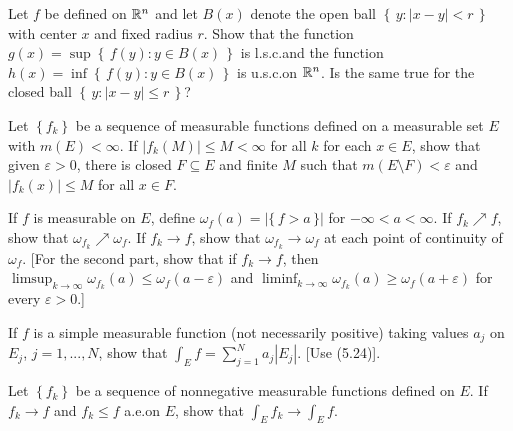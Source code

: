 \begin{problem}
  Let $f$ be defined on $\mathbb{R}^n$ and let $B(x)$ denote the open ball
  $\left\{\,y:|x-y|<r\,\right\}$ with center $x$ and fixed radius $r$. Show
  that the function $g(x)=\sup\left\{\,f(y):y\in B(x)\,\right\}$ is
  l.s.c.\@ and the function $h(x)=\inf\left\{\,f(y):y\in B(x)\,\right\}$ is
  u.s.c.\@ on $\mathbb{R}^n$. Is the same true for the closed ball
  $\left\{\,y:|x-y|\leq r\,\right\}$?
\end{problem}
\begin{solution}
\end{solution}

\begin{problem}
  Let $\left\{f_k\right\}$ be a sequence of measurable functions defined on
  a measurable set $E$ with $m(E)<\infty$. If $|f_k(M)|\leq M<\infty$ for
  all $k$ for each $x\in E$, show that given $\varepsilon>0$, there is
  closed $F\subseteq E$ and finite $M$ such that
  $m(E\setminus F)<\varepsilon$ and $|f_k(x)|\leq M$ for all $x\in F$.
\end{problem}
\begin{solution}
\end{solution}

\begin{problem}
  If $f$ is measurable on $E$, define $\omega_f(a)=|\{\,f>a\,\}|$ for
  $-\infty<a<\infty$. If $f_k\nearrow f$, show that
  $\omega_{f_k}\nearrow\omega_f$. If $f_k\to f$, show that
  $\omega_{f_k}\to\omega_f$ at each point of continuity of $\omega_f$. [For
  the second part, show that if $f_k\to f$, then
  $\limsup_{k\to\infty}\omega_{f_k}(a)\leq\omega_f(a-\varepsilon)$ and
  $\liminf_{k\to\infty}\omega_{f_k}(a)\geq\omega_f(a+\varepsilon)$ for
  every $\varepsilon>0$.]
\end{problem}
\begin{solution}
\end{solution}

\begin{problem}
  If $f$ is a simple measurable function (not necessarily positive) taking
  values $a_j$ on $E_j$, $j=1,...,N$, show that
  $\int_E f=\sum_{j=1}^N a_j|E_j|$. [Use (5.24)].
\end{problem}
\begin{solution}
\end{solution}

\begin{problem}
Let $\left\{f_k\right\}$ be a sequence of nonnegative measurable functions
defined on $E$. If $f_k\to f$ and $f_k\leq f$ a.e.\@ on $E$, show that
$\int_E f_k\to\int_E f$.
\end{problem}
\begin{solution}
\end{solution}

